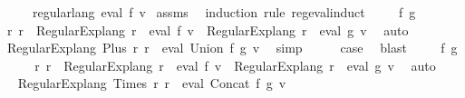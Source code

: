 \begin{isabellebody}
\ \ \ \ \ {\isachardoublequoteopen}regular{\isacharunderscore}{\kern0pt}lang\ {\isacharparenleft}{\kern0pt}eval\ f\ v{\isacharparenright}{\kern0pt}{\isachardoublequoteclose}\isanewline
%
\isadelimproof
%
\endisadelimproof
%
\isatagproof
{}\isamarkupfalse%
\ assms\ \isamarkupfalse%
\ {\isacharparenleft}{\kern0pt}induction\ rule{\isacharcolon}{\kern0pt}\ reg{\isacharunderscore}{\kern0pt}eval{\isachardot}{\kern0pt}induct{\isacharparenright}{\kern0pt}\isanewline
\ \ \isamarkupfalse%
\ {\isacharparenleft}{\kern0pt}{}\ f\ g{\isacharparenright}{\kern0pt}\isanewline
\ \ \isamarkupfalse%
\ \isamarkupfalse%
\ r{}\ r{}\ \ {\isachardoublequoteopen}Regular{\isacharunderscore}{\kern0pt}Exp{\isachardot}{\kern0pt}lang\ r{}\ {\isacharequal}{\kern0pt}\ eval\ f\ v\ {\isasymand}\ Regular{\isacharunderscore}{\kern0pt}Exp{\isachardot}{\kern0pt}lang\ r{}\ {\isacharequal}{\kern0pt}\ eval\ g\ v{\isachardoublequoteclose}\ \isamarkupfalse%
\ auto\isanewline
\ \ \isamarkupfalse%
\ \isamarkupfalse%
\ {\isachardoublequoteopen}Regular{\isacharunderscore}{\kern0pt}Exp{\isachardot}{\kern0pt}lang\ {\isacharparenleft}{\kern0pt}Plus\ r{}\ r{}{\isacharparenright}{\kern0pt}\ {\isacharequal}{\kern0pt}\ eval\ {\isacharparenleft}{\kern0pt}Union\ f\ g{\isacharparenright}{\kern0pt}\ v{\isachardoublequoteclose}\ \isamarkupfalse%
\ simp\isanewline
\ \ \isamarkupfalse%
\ \isamarkupfalse%
\ {\isacharquery}{\kern0pt}case\ \isamarkupfalse%
\ blast\isanewline
{}\isamarkupfalse%
\isanewline
\ \ \isamarkupfalse%
\ {\isacharparenleft}{\kern0pt}{}\ f\ g{\isacharparenright}{\kern0pt}\isanewline
\ \ \isamarkupfalse%
\ \isamarkupfalse%
\ r{}\ r{}\ \ {\isachardoublequoteopen}Regular{\isacharunderscore}{\kern0pt}Exp{\isachardot}{\kern0pt}lang\ r{}\ {\isacharequal}{\kern0pt}\ eval\ f\ v\ {\isasymand}\ Regular{\isacharunderscore}{\kern0pt}Exp{\isachardot}{\kern0pt}lang\ r{}\ {\isacharequal}{\kern0pt}\ eval\ g\ v{\isachardoublequoteclose}\ \isamarkupfalse%
\ auto\isanewline
\ \ \isamarkupfalse%
\ \isamarkupfalse%
\ {\isachardoublequoteopen}Regular{\isacharunderscore}{\kern0pt}Exp{\isachardot}{\kern0pt}lang\ {\isacharparenleft}{\kern0pt}Times\ r{}\ r{}{\isacharparenright}{\kern0pt}\ {\isacharequal}{\kern0pt}\ eval\ {\isacharparenleft}{\kern0pt}Concat\ f\ g{\isacharparenright}{\kern0pt}\ v{\isachardoublequoteclose}\ \isamarkupfalse%

\end{isabellebody}
